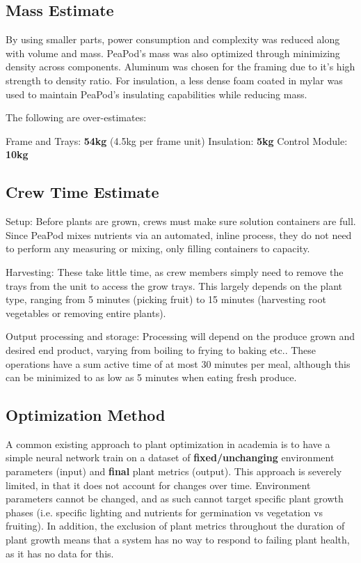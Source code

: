 \documentclass{report}
\begin{document}
\subsection{Mass Estimate}
\label{app:mass}

By using smaller parts, power consumption and complexity was reduced along with volume and mass. PeaPod's mass was also optimized through minimizing density across components. Aluminum was chosen for the framing due to it's high strength to density ratio. For insulation, a less dense foam coated in mylar was used to maintain PeaPod's insulating capabilities while reducing mass.

The following are over-estimates:

Frame and Trays: \textbf{54kg} (4.5kg per frame unit)
Insulation: \textbf{5kg}
Control Module: \textbf{10kg}

\subsection{Crew Time Estimate}
\label{app:crewtime}

Setup: Before plants are grown, crews must make sure solution containers are full. Since PeaPod mixes nutrients via an automated, inline process, they do not need to perform any measuring or mixing, only filling containers to capacity. 

Harvesting: These take little time, as crew members simply need to remove the trays from the unit to access the grow trays. This largely depends on the plant type, ranging from 5 minutes (picking fruit) to 15 minutes (harvesting root vegetables or removing entire plants).

Output processing and storage: Processing will depend on the produce grown and desired end product, varying from boiling to frying to baking etc.. These operations have a sum active time of at most 30 minutes per meal, although this can be minimized to as low as 5 minutes when eating fresh produce.

\subsection{Optimization Method}
\label{app:optimization}

A common existing approach to plant optimization in academia is to have a simple neural network train on a dataset of \textbf{fixed/unchanging} environment parameters (input) and \textbf{final} plant metrics (output). This approach is severely limited, in that it does not account for changes over time. Environment parameters cannot be changed, and as such cannot target specific plant growth phases (i.e. specific lighting and nutrients for germination vs vegetation vs fruiting). In addition, the exclusion of plant metrics throughout the duration of plant growth means that a system has no way to respond to failing plant health, as it has no data for this.
\end{document}

